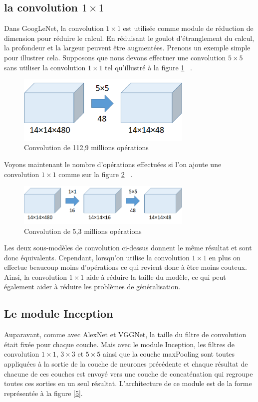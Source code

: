 \documentclass{article}
\begin{document}
\subsection{la convolution $1\times 1$}
Dans GoogLeNet, la convolution $1\times 1$ est utilisée comme module de
réduction de dimension pour réduire le calcul. En réduisant le goulot
d'étranglement du calcul, la profondeur et la largeur peuvent être augmentées.
Prenons un exemple simple pour illustrer cela. Supposons que nous devons
effectuer une convolution $5\times 5$ sans utiliser la convolution $1\times 1$
tel qu'illustré à la figure \ref{3} ~\cite{tsang_2018}.

\begin{figure}[htbp]
    \includegraphics[width=8.4cm]{./figures/Figure2.png} 
    \caption{Convolution de 112,9 millions opérations}
    \label{3} 
\end{figure} 

Voyons maintenant le nombre d’opérations effectuées si l’on ajoute une
convolution $1\times 1$ comme sur la figure \ref{4} ~\cite{tsang_2018}.

\begin{figure}[htbp]
    \includegraphics[width=8.4cm]{./figures/Figure3.png} 
    \caption{Convolution de 5,3 millions opérations}
    \label{4} 
\end{figure} 

Les deux sous-modèles de convolution ci-dessus donnent le même résultat et sont
donc équivalents. Cependant, lorsqu’on utilise la convolution $1\times 1$ en
plus on effectue beaucoup moins d’opérations ce qui revient donc à être moins
couteux. Ainsi, la convolution $1\times 1$ aide à réduire la taille du modèle,
ce qui peut également aider à réduire les problèmes de généralisation.

\subsection{Le module Inception}
Auparavant, comme avec AlexNet et VGGNet, la taille du filtre de convolution
était fixée pour chaque couche. Mais avec le module Inception, les filtres de
convolution $1\times 1$,  $3\times 3$ et  $5\times 5$ ainsi que la couche
maxPooling sont toutes appliquées à la sortie de la couche de neurones
précédente et chaque résultat de chacune de ces couches est envoyé vers une
couche de concaténation qui regroupe toutes ces sorties en un seul résultat.
L’architecture de ce module est de la forme représentée à la figure \ref{5}.
 ~\cite{43022}
\end{document}
